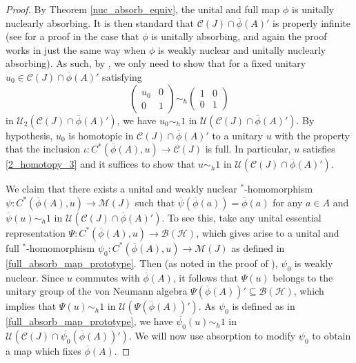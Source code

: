 \documentclass[reqno]{amsart}
\theoremstyle{definition}
\theoremstyle{remark}
\numberwithin{equation}{section}
\theoremstyle{definition}
\newcommand{\calH}{\mathcal{H}}
\newcommand{\calC}{\mathcal{C}}
\newcommand{\calB}{\mathcal{B}}
\newcommand{\calM}{\mathcal{M}}
\newcommand{\calU}{\mathcal{U}}
\begin{document}
\begin{proof} 
By Theorem \ref{nuc_absorb_equiv}, the unital and full map $\phi$ is unitally nuclearly absorbing. It is then standard that $\calC(J) \cap \overline{\phi}(A)'$ is properly infinite (see \cite[Proposition 6.1.1]{Hua_thesis} for a proof in the case that $\phi$ is unitally absorbing, and again the proof works in just the same way when $\phi$ is weakly nuclear and unitally nuclearly absorbing). As such, by \cite[Proposition 5.1]{properly_infinite_C(X)}, we only need to show that for a fixed unitary $u_{0}\in \calC(J) \cap \overline{\phi}(A)'$ satisfying 
\begin{equation} 
\label{2_homotopy_3} 
\begin{pmatrix}
u_{0} & 0 \\
0 & 1
\end{pmatrix} 
\sim_{h}
\begin{pmatrix}
1 & 0 \\
0 & 1
\end{pmatrix} 
\end{equation} 
in $\calU_{2} (\calC(J) \cap \overline{\phi}(A)')$, we have $u_{0}\sim_{h}1$ in $\calU(\calC(J) \cap \overline{\phi}(A)')$. By hypothesis, $u_{0}$ is homotopic in $\calC(J) \cap \overline{\phi}(A)'$ to a unitary $u$ with the property that the inclusion $\iota: C^{\ast} (\overline{\phi}(A), u) \rightarrow \calC(J)$ is full. In particular, $u$ satisfies \eqref{2_homotopy_3} and it suffices to show that $u\sim_{h} 1$ in $\calU(\calC(J) \cap \overline{\phi}(A)')$. 

We claim that there exists a unital and weakly nuclear $^*$-homomorphism $\psi: C^{*}(\overline{\phi}(A), u)\rightarrow \calM(J)$ such that $\overline{\psi}(\overline{\phi}(a)) = \overline{\phi}(a)$ for any $a\in A$ and $\overline{\psi}(u)\sim_{h}1$ in $\calU(\calC(J) \cap \overline{\phi}(A)')$.  To see this, take any unital essential representation $\Psi: C^{*}(\overline{\phi}(A), u)\rightarrow \calB(\calH)$, which gives arise to a unital and full $^*$-homomorphism $\psi_{0}: C^{*}(\overline{\phi}(A), u)\rightarrow \calM(J)$ as defined in \eqref{full_absorb_map_prototype}. Then (as noted in the proof of \cite[Lemma 12]{EK.PJM}), $\psi_{0}$ is weakly nuclear. Since $u$ commutes with $\overline{\phi}(A)$, it follows that $\Psi(u)$ belongs to the unitary group of the von Neumann algebra $\Psi(\overline{\phi}(A))' \subseteq \calB(\calH)$, which implies that $\Psi(u) \sim_{h}1$ in $\calU(\Psi(\overline{\phi}(A))')$. As $\psi_{0}$ is defined as in \eqref{full_absorb_map_prototype}, we have $\overline{\psi_{0}}(u)\sim_{h}1$ in $\calU(\calC(J)\cap \overline{\psi_{0}}(\overline{\phi}(A))')$.  We will now use absorption to modify $\psi_0$ to obtain a map which fixes $\overline{\phi}(A)$.



\end{proof}
\end{document}
